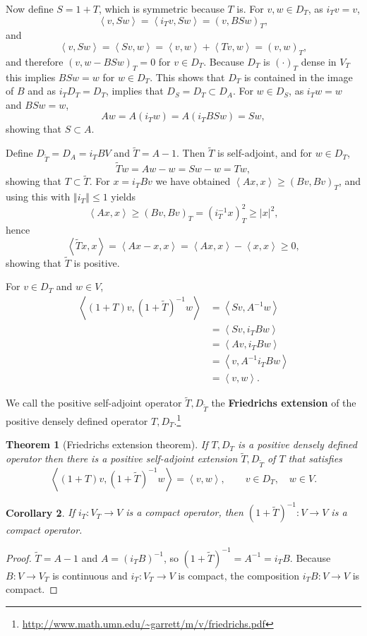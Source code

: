 \documentclass{article}
\newcommand{\inner}[2]{\left\langle #1, #2 \right\rangle}
\newcommand{\norm}[1]{\left\Vert #1 \right\Vert}
\newtheorem{theorem}{Theorem}
\newtheorem{corollary}[theorem]{Corollary}
\theoremstyle{definition}
\begin{document}
Now define $S=1+T$, which is symmetric because $T$ is.
For $v,w \in D_T$, as $i_Tv=v$,
\[
\inner{v}{Sw} =\inner{i_Tv}{Sw} = (v,BSw)_T,
\]
and 
\[
\inner{v}{Sw} = \inner{Sv}{w} = \inner{v}{w}+\inner{Tv}{w} = (v,w)_T,
\]
and therefore $(v,w-BSw)_T=0$ for $v \in D_T$. Because 
$D_T$ is $(\cdot)_T$ dense in $V_T$ this implies $BSw=w$ for $w \in D_T$. This shows
that $D_T$ is contained in the image of $B$ and as $i_TD_T=D_T$, implies that
$D_S = D_T \subset D_A$. 
For $w \in D_S$, as $i_Tw=w$ and $BSw=w$,
\[
Aw = A(i_Tw) = A(i_T BSw) = Sw,
\]
showing that $S \subset A$. 

Define $D_{\widetilde{T}}=D_A=i_TBV$ and $\widetilde{T} = A-1$. Then $\widetilde{T}$ is self-adjoint,
and for $w \in D_T$,
\[
\widetilde{T}w = Aw-w = Sw-w = Tw, 
\]
showing that $T \subset \widetilde{T}$. 
For $x = i_TBv$ we have obtained $\inner{Ax}{x} \geq (Bv,Bv)_T$, and using this with
$\norm{i_T} \leq 1$ yields
\[
\inner{Ax}{x} \geq (Bv,Bv)_T =
(i_T^{-1}x)_T^2
\geq |x|^2,
\]
hence
\[
\inner{\widetilde{T}x}{x} = \inner{Ax-x}{x} = \inner{Ax}{x}-\inner{x}{x} \geq 0,
\]
showing that $\widetilde{T}$ is positive. 

For $v \in D_T$ and $w \in V$,
\begin{align*}
\inner{(1+T)v}{(1+\widetilde{T})^{-1}w}&=\inner{Sv}{A^{-1}w}\\
&=\inner{Sv}{i_TBw}\\
&=\inner{Av}{i_TBw}\\
&=\inner{v}{A^{-1} i_TBw}\\
&=\inner{v}{w}.
\end{align*}

We call the positive self-adjoint operator $\widetilde{T},D_{\widetilde{T}}$ the \textbf{Friedrichs extension} of
the positive densely defined operator $T,D_T$.\footnote{\url{http://www.math.umn.edu/~garrett/m/v/friedrichs.pdf}}


\begin{theorem}[Friedrichs extension theorem]
If $T,D_T$ is a positive densely defined operator then there is a positive self-adjoint
extension $\widetilde{T},D_{\widetilde{T}}$ of $T$ that satisfies
\[
\inner{(1+T)v}{(1+\widetilde{T})^{-1}w} = \inner{v}{w},\qquad v \in D_T,\quad w \in V.
\]
\end{theorem}


\begin{corollary}
If $i_T:V_T \to V$ is a compact operator, then $(1+\widetilde{T})^{-1}:V \to V$ is a compact operator.
\end{corollary}
\begin{proof}
$\widetilde{T}=A-1$ and $A=(i_TB)^{-1}$, so $(1+\widetilde{T})^{-1} = A^{-1}= i_TB$. 
Because $B:V \to V_T$ is continuous and $i_T:V_T \to V$ is compact, 
the composition $i_TB:V \to V$ is compact.
\end{proof}
\end{document}
